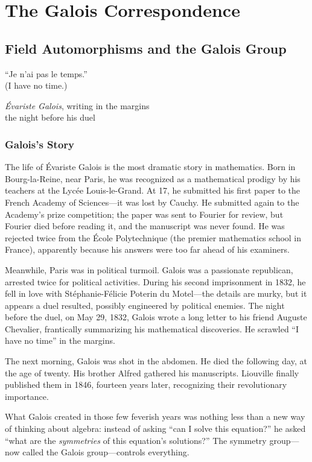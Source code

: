 \documentclass[11pt, a4paper, oneside]{book}
\begin{document}
\part{The Galois Correspondence}

\chapter{Field Automorphisms and the Galois Group}

\epigraph{``Je n'ai pas le temps.''\\ \normalfont(I have no time.)}%
{\textit{Évariste Galois}, writing in the margins\\the night before his duel}

\section{Galois's Story}

\begin{historical}[title={Évariste Galois (1811--1832)}]
The life of Évariste Galois is the most dramatic story in mathematics. Born in
Bourg-la-Reine, near Paris, he was recognized as a mathematical prodigy by his
teachers at the Lycée Louis-le-Grand. At 17, he submitted his first paper to
the French Academy of Sciences---it was lost by Cauchy. He submitted again to
the Academy's prize competition; the paper was sent to Fourier for review, but
Fourier died before reading it, and the manuscript was never found. He was
rejected twice from the École Polytechnique (the premier mathematics school in
France), apparently because his answers were too far ahead of his examiners.

Meanwhile, Paris was in political turmoil. Galois was a passionate republican,
arrested twice for political activities. During his second imprisonment in
1832, he fell in love with Stéphanie-Félicie Poterin du Motel---the details
are murky, but it appears a duel resulted, possibly engineered by political
enemies. The night before the duel, on May 29, 1832, Galois wrote a long
letter to his friend Auguste Chevalier, frantically summarizing his
mathematical discoveries. He scrawled ``I have no time'' in the margins.

The next morning, Galois was shot in the abdomen. He died the following day,
at the age of twenty. His brother Alfred gathered his manuscripts. Liouville
finally published them in 1846, fourteen years later, recognizing their
revolutionary importance.

What Galois created in those few feverish years was nothing less than a new
way of thinking about algebra: instead of asking ``can I solve this equation?''
he asked ``what are the \emph{symmetries} of this equation's solutions?'' The
symmetry group---now called the Galois group---controls everything.
\end{historical}
\end{document}
